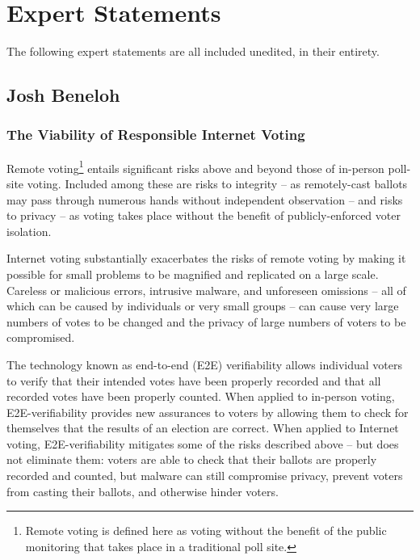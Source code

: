 \ifstatementsonly
\renewcommand{\thesection}{\arabic{section}}
\else
\chapter{Expert Statements}
\label{appendix:expert_statements}

The following expert statements are all included unedited, in their
entirety.
\fi

\section{Josh Beneloh}

\subsection*{The Viability of Responsible Internet Voting}

Remote voting\footnote{Remote voting is defined here as voting without
  the benefit of the public monitoring that takes place in a
  traditional poll site.}  entails significant risks above and beyond
those of in-person poll-site voting.  Included among these are risks
to integrity – as remotely-cast ballots may pass through numerous
hands without independent observation – and risks to privacy – as
voting takes place without the benefit of publicly-enforced voter
isolation.

Internet voting substantially exacerbates the risks of remote voting
by making it possible for small problems to be magnified and
replicated on a large scale.  Careless or malicious errors, intrusive
malware, and unforeseen omissions – all of which can be caused by
individuals or very small groups – can cause very large numbers of
votes to be changed and the privacy of large numbers of voters to be
compromised.

The technology known as end-to-end (E2E) verifiability allows
individual voters to verify that their intended votes have been
properly recorded and that all recorded votes have been properly
counted.  When applied to in-person voting, E2E-verifiability provides
new assurances to voters by allowing them to check for themselves that
the results of an election are correct.  When applied to Internet
voting, E2E-verifiability mitigates some of the risks described above
– but does not eliminate them:  voters are able to check that their
ballots are properly recorded and counted, but malware can still
compromise privacy, prevent voters from casting their ballots, and
otherwise hinder voters.

